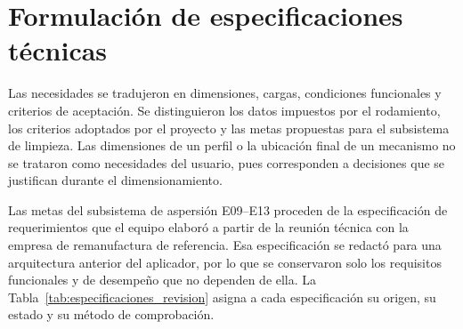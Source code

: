 \section{Formulación de especificaciones técnicas}

Las necesidades se tradujeron en dimensiones, cargas, condiciones funcionales y criterios de aceptación. Se distinguieron los datos impuestos por el rodamiento, los criterios adoptados por el proyecto y las metas propuestas para el subsistema de limpieza. Las dimensiones de un perfil o la ubicación final de un mecanismo no se trataron como necesidades del usuario, pues corresponden a decisiones que se justifican durante el dimensionamiento.

Las metas del subsistema de aspersión E09--E13 proceden de la especificación de requerimientos que el equipo elaboró a partir de la reunión técnica con la empresa de remanufactura de referencia. Esa especificación se redactó para una arquitectura anterior del aplicador, por lo que se conservaron solo los requisitos funcionales y de desempeño que no dependen de ella. La Tabla~\ref{tab:especificaciones_revision} asigna a cada especificación su origen, su estado y su método de comprobación.

